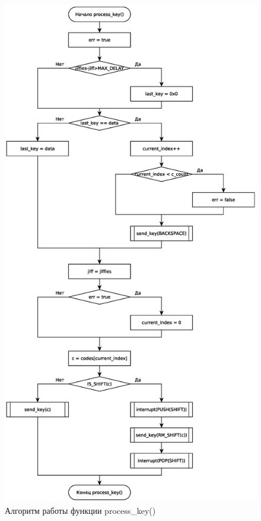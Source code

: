 \begin{figure}[p]
	\centering
	\includegraphics[scale=0.5]{process_key.eps}
	\caption*{Алгоритм работы функции process\_key()}
\end{figure}
\restoregeometry
\newpage
